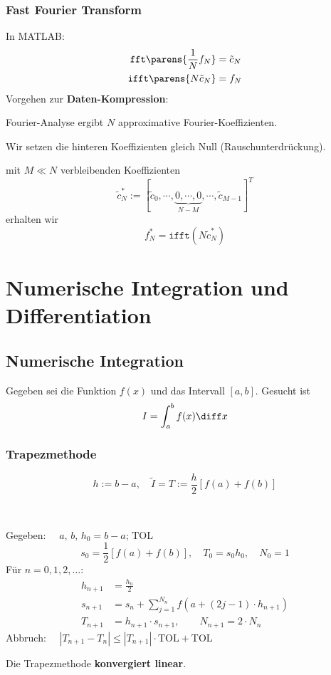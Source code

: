 		\subsubsection{Fast Fourier Transform} In MATLAB:
			\begin{align*}
				\texttt{fft} \parens{ \frac{1}{N}f_N } &= \tilde c_N \\
				\texttt{ifft} \parens{ N \tilde c_N } &= f_N
			\end{align*}
			Vorgehen zur \textbf{Daten-Kompression}:
			\begin{tightenumerate}
				\item Fourier-Analyse ergibt $N$ approximative Fourier-Koeffizienten.
				\item Wir setzen die hinteren Koeffizienten gleich Null (Rauschunterdrückung).
				\item mit $M \ll N$ verbleibenden Koeffizienten
					\[
						\tilde c_N^* := [\tilde c_0, \cdots, \underbrace{0, \cdots, 0}_{N-M}, \cdots, \tilde c_{M-1}]^T
					\]
					erhalten wir
					\[
						f_N^* = \texttt{ifft}\left( N \tilde c_N^*\right)
					\]
			\end{tightenumerate}

\section{Numerische Integration und Differentiation}
	\subsection{Numerische Integration} Gegeben sei die Funktion $f(x)$ und das Intervall $[a,b]$. Gesucht ist
		\[
			I = \int_a^b f(x) \diff x
		\]

		\subsubsection{Trapezmethode}
			\[
				h:= b-a, \quad \tilde I = T:=\frac{h}{2} [ f(a) + f(b) ]
			\]

			\begin{algo} ~

				Gegeben: $\quad a,\, b,\, h_0 = b-a;\, \mathrm{TOL}$
				\[
					s_0 = \frac{1}{2}\left[ f(a) + f(b)\right], \quad T_0 = s_0 h_0, \quad N_0 =1
				\]
				Für $n=0,1,2,\dots$:
				\begin{align*}
					h_{n+1} &= \frac{h_n}{2} \\
					s_{n+1} &= s_n + \sum\limits_{j=1}^{N_n}f\left( a+(2j-1)\cdot h_{n+1}\right) \\
					T_{n+1} &= h_{n+1}\cdot s_{n+1}, \qquad N_{n+1}=2\cdot N_n
				\end{align*}
				Abbruch: $\quad |T_{n+1}-T_n|\leq |T_{n+1}|\cdot \mathrm{TOL} + \mathrm{TOL}$

				Die Trapezmethode \textbf{konvergiert linear}.
			\end{algo}

